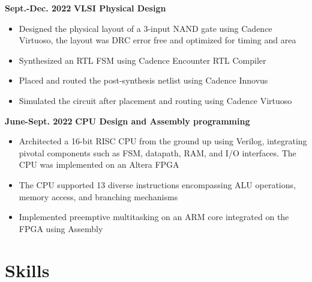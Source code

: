 \documentclass[11pt,a4paper,sans]{moderncv}
\begin{document}
\cventry
{\textnormal{\textbf{Sept.-Dec. 2022}}}
{\textnormal{\textbf{VLSI Physical Design}}}
{}{}{}
{
    \begin{itemize}
    \item Designed the physical layout of a 3-input NAND gate using Cadence Virtuoso, the layout was DRC error free and optimized for timing and area
    \item Synthesized an RTL FSM using Cadence Encounter RTL Compiler
    \item Placed and routed the post-synthesis netlist using Cadence Innovus
    \item Simulated the circuit after placement and routing using Cadence Virtuoso 
\end{itemize}
}

\cventry
{\textnormal{\textbf{June-Sept. 2022}}}
{\textnormal{\textbf{CPU Design and Assembly programming}}}
{}{}{}
{
    \begin{itemize}
    \item Architected a 16-bit RISC CPU from the ground up using Verilog, integrating pivotal components such as FSM, datapath, RAM, and I/O interfaces. The CPU was implemented on an Altera FPGA
    \item The CPU supported 13 diverse instructions encompassing ALU operations, memory access, and branching mechanisms
    \item Implemented preemptive multitasking on an ARM core integrated on the FPGA using Assembly
\end{itemize}
}

\section{Skills}

\end{document}
